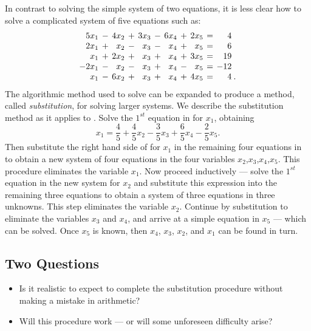 In contrast to solving the simple system of two equations,
it is less clear how to solve a complicated system of five
equations such as:
\begin{equation}    \label{big}
\arraycolsep 2pt
\begin{array}{rcrcrcrcrcrl}
 5x_1 & - & 4x_2 & + & 3x_3 & - & 6x_4 & + & 2x_5 & = &   4  & \\
 2x_1 & + &  x_2 & - &  x_3 & - &  x_4 & + &  x_5 & = &   6  & \\
  x_1 & + & 2x_2 & + &  x_3 & + &  x_4 & + & 3x_5 & = &  19  & \\
-2x_1 & - &  x_2 & - &  x_3 & + &  x_4 & - &  x_5 & = & -12  & \\
  x_1 & - & 6x_2 & + &  x_3 & + &  x_4 & + & 4x_5 & = &   4  & \!
.
\end{array}
\end{equation}
The algorithmic method used to solve  can be expanded
to produce a method, called {\em substitution\/},
 for solving larger systems. We describe the
substitution method as it applies to .  Solve the
$1^{st}$ equation in  for $x_1$, obtaining
\begin{equation} \label{x1}
x_1 = \frac{4}{5}  + \frac{4}{5}x_2 - \frac{3}{5}x_3
   + \frac{6}{5}x_4 - \frac{2}{5}x_5.
\end{equation}
Then substitute the right hand side of  for $x_1$ in the
remaining four equations in  to obtain a new system of
four equations in the four variables $x_2$,$x_3$,$x_4$,$x_5$.
This procedure eliminates the variable $x_1$.  Now proceed
inductively --- solve the $1^{st}$ equation in the new system
for $x_2$ and substitute this expression into the remaining
three equations to obtain a system of three equations in three
unknowns.  This step eliminates the variable $x_2$.  Continue by
substitution to eliminate the variables $x_3$ and $x_4$, and
arrive at a simple equation in $x_5$ --- which can be solved.
Once $x_5$ is known, then $x_4$, $x_3$, $x_2$, and $x_1$ can be
found in turn.

\subsection*{Two Questions}

\begin{itemize}
\item Is it realistic to expect to complete the substitution
procedure without making a mistake in arithmetic?
\item Will this procedure work --- or will some unforeseen
difficulty arise?
\end{itemize}

